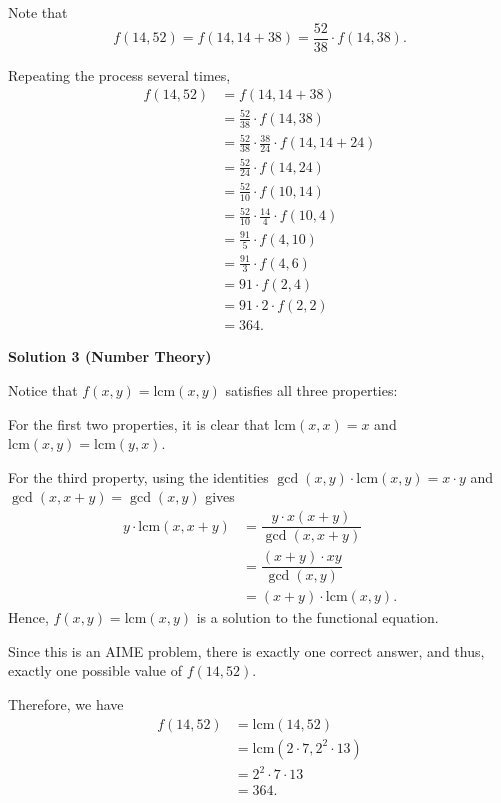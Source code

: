 \begin{enumerate}
 Note that 
 \[f(14,52) = f(14,14 + 38) = \frac{52}{38}\cdot f(14,38).\]

 Repeating the process several times,
 \begin{align*} f(14,52) & = f(14,14 + 38) \\ & = \frac{52}{38}\cdot f(14,38) \\ & = \frac{52}{38}\cdot \frac{38}{24}\cdot f(14,14 + 24) \\ & = \frac{52}{24}\cdot f(14,24) \\ & = \frac{52}{10}\cdot f(10,14) \\ & = \frac{52}{10}\cdot \frac{14}{4}\cdot f(10,4) \\ & = \frac{91}{5}\cdot f(4,10) \\ & = \frac{91}{3}\cdot f(4,6) \\ & = 91\cdot f(2,4) \\ & = 91\cdot 2 \cdot f(2,2) \\ & = \boxed{364}. \end{align*}





\textbf{Solution 3 (Number Theory)}

Notice that $f(x,y) = \mathrm{lcm}(x,y)$ satisfies all three properties: 

 For the first two properties, it is clear that $\mathrm{lcm}(x,x) = x$ and $\mathrm{lcm}(x,y) = \mathrm{lcm}(y,x)$. 

 For the third property, using the identities $\gcd(x,y) \cdot \mathrm{lcm}(x,y) = x\cdot y$ and $\gcd(x,x+y) = \gcd(x,y)$ gives
 \begin{align*} y \cdot \mathrm{lcm}(x,x+y) &= \dfrac{y \cdot x(x+y)}{\gcd(x,x+y)} \\ &= \dfrac{(x+y) \cdot xy}{\gcd(x,y)} \\ &= (x+y) \cdot \mathrm{lcm}(x,y). \end{align*}
Hence, $f(x,y) = \mathrm{lcm}(x,y)$ is a solution to the functional equation. 

 Since this is an AIME problem, there is exactly one correct answer, and thus, exactly one possible value of $f(14,52)$. 

 Therefore, we have 
 \begin{align*} f(14,52) &= \mathrm{lcm}(14,52) \\ &= \mathrm{lcm}(2 \cdot 7,2^2 \cdot 13) \\ &= 2^2 \cdot 7 \cdot 13 \\ &= \boxed{364}. \end{align*}



\end{enumerate}
